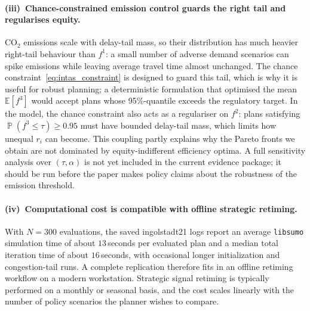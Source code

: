 \documentclass[12pt]{article}
\theoremstyle{plain}
\theoremstyle{definition}
\theoremstyle{remark}
\DeclareMathOperator{\Prob}{\mathbb{P}}
\begin{document}
\paragraph{(iii)~Chance-constrained emission control guards the right
tail and regularises equity.}
CO$_{2}$ emissions scale with delay-tail mass, so their distribution
has much heavier right-tail behaviour than $f^{1}$: a small number of
adverse demand scenarios can spike emissions while leaving average
travel time almost unchanged.  The chance
constraint~\eqref{eq:intas_constraint} is designed to guard this tail,
which is why it is useful for robust planning; a
deterministic formulation that optimised the mean $\mathbb{E}[f^{3}]$
would accept plans whose 95\%-quantile exceeds the regulatory target.
In the model, the chance constraint also acts as a regulariser on
$f^{2}$: plans satisfying $\Prob(f^{3}\le\tau)\ge 0.95$ must have
bounded delay-tail mass, which limits how unequal $r_{i}$ can become.
This coupling partly explains why the Pareto fronts we obtain are not
dominated by equity-indifferent efficiency optima.  A full sensitivity
analysis over $(\tau,\alpha)$ is not yet included in the current
evidence package; it should be run before the paper makes policy claims
about the robustness of the emission threshold.

\paragraph{(iv)~Computational cost is compatible with offline
strategic retiming.}
With $N=300$ evaluations, the saved ingolstadt21 logs report an average
\texttt{libsumo} simulation time of about $13$\,seconds per evaluated
plan and a median total iteration time of about $16$\,seconds, with
occasional longer initialization and congestion-tail runs.  A complete
replication therefore fits in an offline retiming workflow on a modern
workstation.  Strategic signal retiming is typically performed on a
monthly or seasonal basis, and the cost scales linearly with the number
of policy scenarios the planner wishes to compare.
\end{document}
